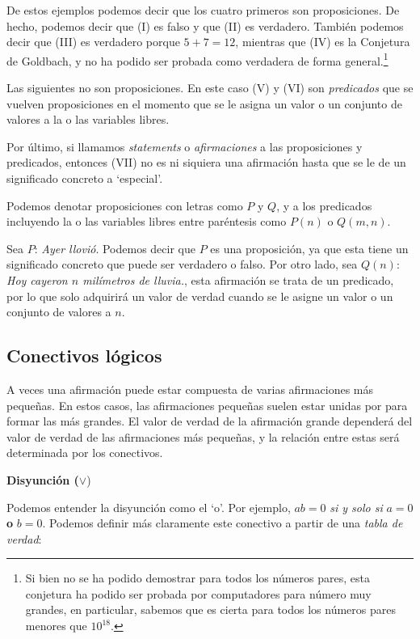 \documentclass[12pt]{book}
\begin{document}
De estos ejemplos podemos decir que los cuatro primeros son proposiciones. De hecho, podemos decir que (I) es falso y que (II) es verdadero. También podemos decir que (III) es verdadero porque $5+7=12$, mientras que (IV) es la Conjetura de Goldbach, y no ha podido ser probada como verdadera de forma general.\footnote{Si bien no se ha podido demostrar para todos los números pares, esta conjetura ha podido ser probada por computadores para número muy grandes, en particular, sabemos que es cierta para todos los números pares menores que $10^{18}$.}

Las siguientes no son proposiciones. En este caso (V) y (VI) son \textit{predicados} que se vuelven proposiciones en el momento que se le asigna un valor o un conjunto de valores a la o las variables libres.

Por último, si llamamos \textit{statements} o \textit{afirmaciones} a las proposiciones y predicados, entonces (VII) no es ni siquiera una afirmación hasta que se le de un significado concreto a `especial'.

Podemos denotar proposiciones con letras como $P$ y $Q$, y a los predicados incluyendo la o las variables libres entre paréntesis como $P(n)$ o $Q(m,n)$.

\begin{exampleenv}
    Sea $P$: \textit{Ayer llovió}. Podemos decir que $P$ es una proposición, ya que esta tiene un significado concreto que puede ser verdadero o falso.
    Por otro lado, sea $Q(n):$\textit{Hoy cayeron $n$ milímetros de lluvia.}, esta afirmación se trata de un predicado, por lo que solo adquirirá un valor de verdad cuando se le asigne un valor o un conjunto de valores a $n$.
\end{exampleenv}

\subsection{Conectivos lógicos}
\noindent
A veces una afirmación puede estar compuesta de varias afirmaciones más pequeñas. En estos casos, las afirmaciones pequeñas suelen estar unidas por  para formar las más grandes. El valor de verdad de la afirmación grande dependerá del valor de verdad de las afirmaciones más pequeñas, y la relación entre estas será determinada por los conectivos.

\begin{center}
    \textbf{Disyunción ($\vee$})
\end{center}
Podemos entender la disyunción como el `o'. Por ejemplo, $ab=0$ \textit{si y solo si} $a=0$ \textbf{o} $b=0$. Podemos definir más claramente este conectivo a partir de una \textit{tabla de verdad}:
\end{document}
